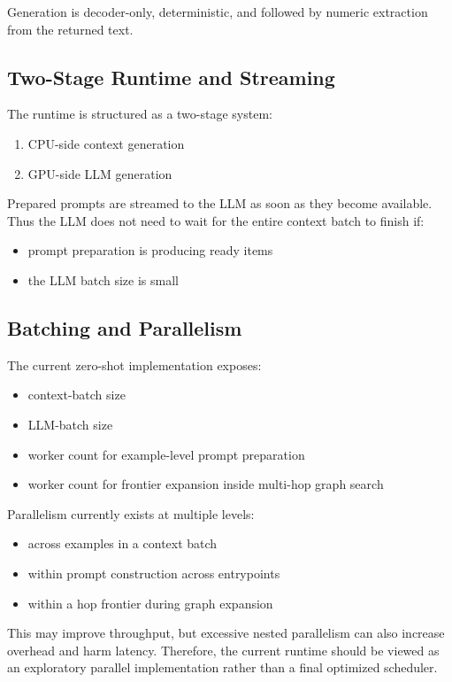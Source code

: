 \documentclass[11pt]{article}
\begin{document}
Generation is decoder-only, deterministic, and followed by numeric extraction from the returned text.

\subsection{Two-Stage Runtime and Streaming}

The runtime is structured as a two-stage system:
\begin{enumerate}
\item CPU-side context generation
\item GPU-side LLM generation
\end{enumerate}

Prepared prompts are streamed to the LLM as soon as they become available. Thus the LLM does not need to wait for the entire context batch to finish if:
\begin{itemize}
\item prompt preparation is producing ready items
\item the LLM batch size is small
\end{itemize}

\subsection{Batching and Parallelism}

The current zero-shot implementation exposes:
\begin{itemize}
\item context-batch size
\item LLM-batch size
\item worker count for example-level prompt preparation
\item worker count for frontier expansion inside multi-hop graph search
\end{itemize}

Parallelism currently exists at multiple levels:
\begin{itemize}
\item across examples in a context batch
\item within prompt construction across entrypoints
\item within a hop frontier during graph expansion
\end{itemize}

This may improve throughput, but excessive nested parallelism can also increase overhead and harm latency. Therefore, the current runtime should be viewed as an exploratory parallel implementation rather than a final optimized scheduler.
\end{document}
